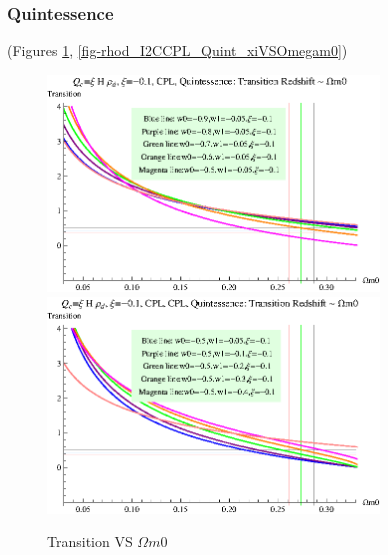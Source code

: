 \documentclass[12pt,a4paper]{article}
\begin{document}
\subsubsection{Quintessence}

(Figures \ref{fig-rhod_I2CCPL_Quint_TransVSOmegam0}, \ref{fig-rhod_I2CCPL_Quint_xiVSOmegam0})

\begin{figure}
\centering
\includegraphics[width=250pt]{rhod_I2CCPL_Quint_TransVSOmegam01.eps}
\includegraphics[width=250pt]{rhod_I2CCPL_Quint_TransVSOmegam02.eps}
\caption{Transition VS $\Omega m0$}\label{fig-rhod_I2CCPL_Quint_TransVSOmegam0}
\end{figure}
\end{document}
